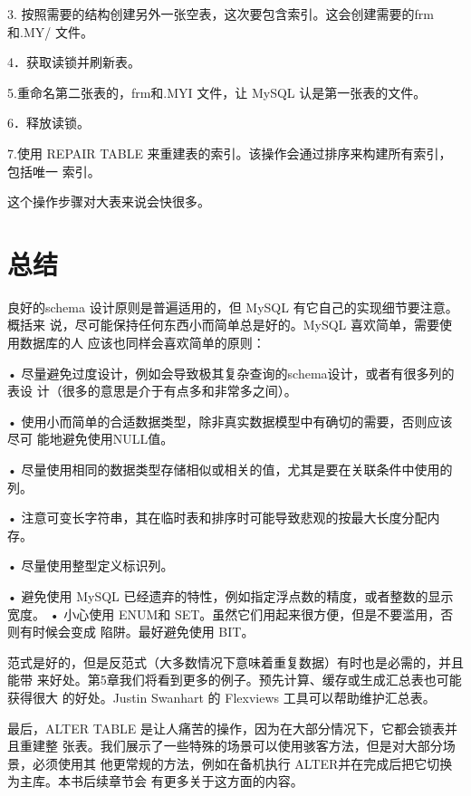3. 按照需要的结构创建另外一张空表，这次要包含索引。这会创建需要的frm和.MY/
文件。

4．获取读锁并刷新表。

5.重命名第二张表的，frm和.MYI 文件，让 MySQL 认是第一张表的文件。

6．释放读锁。

7.使用 REPAIR TABLE 来重建表的索引。该操作会通过排序来构建所有索引，包括唯一
索引。

这个操作步骤对大表来说会快很多。

\section{总结}
良好的schema 设计原则是普遍适用的，但 MySQL 有它自己的实现细节要注意。概括来
说，尽可能保持任何东西小而简单总是好的。MySQL 喜欢简单，需要使用数据库的人
应该也同样会喜欢简单的原则：

• 尽量避免过度设计，例如会导致极其复杂查询的schema设计，或者有很多列的表设
计（很多的意思是介于有点多和非常多之间）。

• 使用小而简单的合适数据类型，除非真实数据模型中有确切的需要，否则应该尽可
能地避免使用NULL值。

• 尽量使用相同的数据类型存储相似或相关的值，尤其是要在关联条件中使用的列。

• 注意可变长字符串，其在临时表和排序时可能导致悲观的按最大长度分配内存。

• 尽量使用整型定义标识列。

• 避免使用 MySQL 已经遗弃的特性，例如指定浮点数的精度，或者整数的显示宽度。
• 小心使用 ENUM和 SET。虽然它们用起来很方便，但是不要滥用，否则有时候会变成
陷阱。最好避免使用 BIT。

范式是好的，但是反范式（大多数情况下意味着重复数据）有时也是必需的，并且能带
来好处。第5章我们将看到更多的例子。预先计算、缓存或生成汇总表也可能获得很大
的好处。Justin Swanhart 的 Flexviews 工具可以帮助维护汇总表。

最后，ALTER TABLE 是让人痛苦的操作，因为在大部分情况下，它都会锁表并且重建整
张表。我们展示了一些特殊的场景可以使用骇客方法，但是对大部分场景，必须使用其
他更常规的方法，例如在备机执行 ALTER并在完成后把它切换为主库。本书后续章节会
有更多关于这方面的内容。



